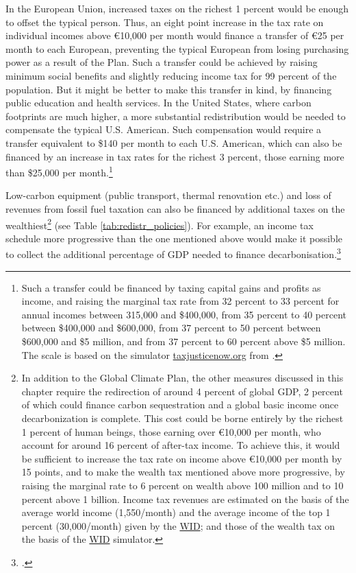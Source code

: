 \documentclass[a5paper,english,openany]{memoir}
\begin{document}
In the European Union, increased taxes on the richest 1 percent would be enough to offset the typical person. %
Thus, an  eight point %
increase in the tax rate on individual incomes above \euro{}10,000 per month would finance a transfer of \euro{}25 per month to each European, preventing the typical European from losing purchasing power as a result of the Plan. Such a transfer could be achieved by raising minimum social benefits and slightly reducing income tax for 99 percent of the population. But it might be better to make this transfer in kind, by financing public education and health services. In the United States, where carbon footprints are much higher, a more substantial redistribution would be needed to compensate the typical U.S. American. Such compensation would require a transfer equivalent to \$140 per month to each U.S. American, which can also be financed by an increase in tax rates for the richest 3 percent, those earning more than \$25,000 per month.\footnote{Such a transfer could be financed by taxing capital gains and profits as income, and raising the marginal tax rate from 32 percent to 33 percent for annual incomes between 315,000 and \$400,000, from 35 percent to 40 percent between \$400,000 and \$600,000, from 37 percent to 50 percent between \$600,000 and \$5 million, and from 37 percent to 60 percent above \$5 million. The scale is based on the simulator \href{https://taxjusticenow.org/}{taxjusticenow.org} from \cite{saez_triumph_2019}.}%

Low-carbon equipment (public transport, thermal renovation etc.) and loss of revenues from fossil fuel taxation %
can also be financed by additional taxes on the wealthiest\footnote{In addition to the Global Climate Plan, the other measures discussed in this chapter require the redirection of around 4 percent %
of global GDP, 2 percent  %
of which could finance carbon sequestration and a global basic income once decarbonization is complete. %
This cost could be borne entirely by the richest 1 percent of human beings, those earning over \euro{}10,000 per month, %
who account for around 16 percent of after-tax income. To achieve this, it would be sufficient to increase the tax rate on income above \euro{}10,000 per month by 15 points, and to make the wealth tax mentioned above more progressive, by raising the marginal rate to 6 percent on wealth above 100 million and to 10 percent above 1 billion. Income tax revenues are estimated on the basis of the average world income (\textit{\texteuro{}}1,550/month) and the average income of the top 1 percent (\textit{\texteuro{}}30,000/month) given by the \href{https://wid.world/data/}{WID}; and those of the wealth tax on the basis of the \href{https://wid.world/world-wealth-tax-simulator/}{WID} simulator.
} (see Table \ref{tab:redistr_policies}). 
For example, an income tax schedule more progressive than the one mentioned above would make it possible to collect the additional percentage of GDP needed to finance decarbonisation.\footnote{\citet{aie_net_2021}.} 
\end{document}

